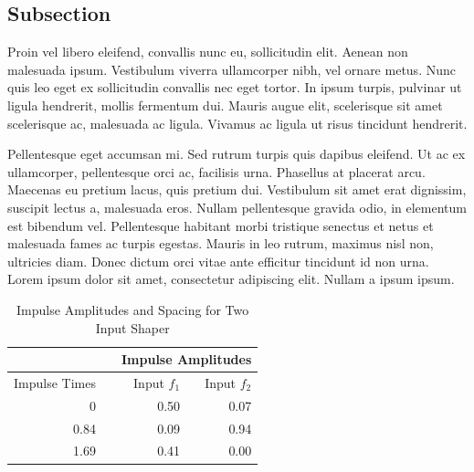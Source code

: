 \subsection[Subsection.]{Subsection}
Proin vel libero eleifend, convallis nunc eu, sollicitudin elit. Aenean non malesuada ipsum. Vestibulum viverra ullamcorper nibh, vel ornare metus. Nunc quis leo eget ex sollicitudin convallis nec \cite{Maeda1999} eget tortor. In ipsum turpis, pulvinar ut ligula hendrerit, mollis fermentum dui. Mauris augue elit, scelerisque sit amet scelerisque ac, malesuada ac ligula. Vivamus ac ligula ut risus tincidunt hendrerit.

Pellentesque eget accumsan mi. Sed rutrum turpis quis dapibus eleifend. Ut ac ex ullamcorper, pellentesque orci ac, facilisis urna. Phasellus at placerat arcu. Maecenas eu pretium lacus, quis pretium dui. Vestibulum sit amet erat dignissim, suscipit lectus a, malesuada eros. Nullam pellentesque gravida odio, in elementum est bibendum vel. Pellentesque habitant morbi tristique senectus et netus et malesuada fames ac turpis egestas. Mauris in leo rutrum, maximus nisl non, ultricies diam. Donec dictum orci vitae ante efficitur tincidunt id non urna. Lorem ipsum dolor sit amet, consectetur adipiscing elit. Nullam a ipsum ipsum.

\begin{table}[t!]
\centering
\caption{Impulse Amplitudes and Spacing for Two Input Shaper}
\label{table:multi-impulses}
\begin{tabular}{@{}rrrr@{}}
\toprule
\multicolumn{1}{l}{} &  & \multicolumn{2}{c}{Impulse Amplitudes} \\ \midrule
Impulse Times &  & Input $f_1$ & Input $f_2$ \\ \cmidrule(l){3-4} 
0 &  & 0.50 & 0.07 \\
0.84 &  & 0.09 & 0.94 \\
1.69 &  & 0.41 & 0.00 \\ \bottomrule
\end{tabular}
\end{table}